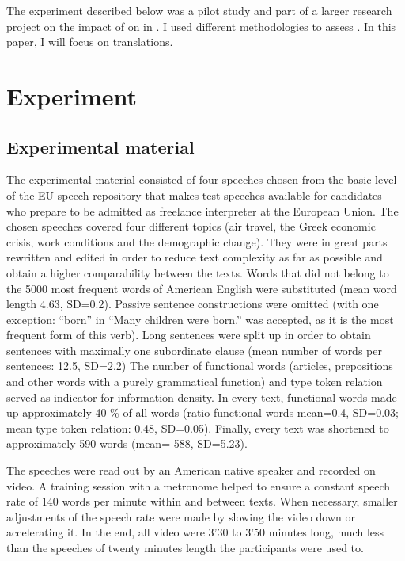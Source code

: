 \documentclass[output=paper]{LSP/langsci}
\begin{document}
The experiment described below was a pilot study and part of a larger research project on the impact of  on  in . I used different methodologies to assess . In this paper, I will focus on  translations.

\section{Experiment}
\subsection{Experimental material}

The experimental material consisted of four speeches chosen from the basic level of the EU speech repository that makes test speeches available for candidates who prepare to be admitted as freelance interpreter at the European Union. The chosen speeches covered four different topics (air travel, the Greek economic crisis, work conditions and the demographic change). They were in great parts rewritten and edited in order to reduce text complexity as far as possible and obtain a higher comparability between the texts. Words that did not belong to the 5000 most frequent words of American English \citep{Davies2009} were substituted (mean word length 4.63, SD=0.2). Passive sentence constructions were omitted (with one exception: ``born'' in ``Many children were born.'' was accepted, as it is the most frequent form of this verb). Long sentences were split up in order to obtain sentences with maximally one subordinate clause (mean number of words per sentences: 12.5, SD=2.2) The number of functional words (articles, prepositions and other words with a purely grammatical function) and type token relation served as indicator for information density. In every text, functional words made up approximately 40 \% of all words (ratio functional words mean=0.4, SD=0.03; mean type token relation: 0.48, SD=0.05). Finally, every text was shortened to approximately 590 words (mean= 588, SD=5.23). 

The speeches were read out by an American native speaker and recorded on video. A training session with a metronome helped to ensure a constant speech rate of 140 words per minute within and between texts. When necessary, smaller adjustments of the speech rate were made by slowing the video down or accelerating it. In the end, all video were 3'30 to 3'50 minutes long, much less than the speeches of twenty minutes length the participants were used to.
\end{document}
